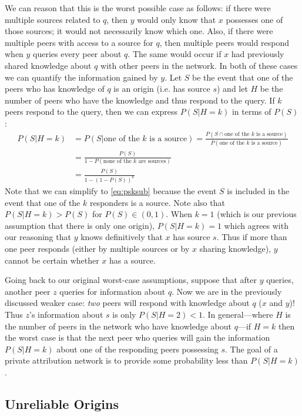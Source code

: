 \documentclass{article}
\begin{document}
We can reason that this is the worst possible case as follows: if there were
multiple sources related to $q$, then $y$ would only know that $x$ possesses one
of those sources; it would not necessarily know which one. Also, if there were
multiple peers with access to a source for $q$, then multiple peers would
respond when $y$ queries every peer about $q$. The same would occur if $x$ had
previously shared knowledge about $q$ with other peers in the network. In both
of these cases we can quantify the information gained by $y$. Let $S$ be the
event that one of the peers who has knowledge of $q$ is an origin (i.e. has
source $s$) and let $H$ be the number of peers who have the knowledge and thus
respond to the query.
If $k$ peers respond to the query, then we can express $P(S|H=k)$ in terms of
$P(S)$:
\begin{align}
	P(S|H=k)&=P(S|\text{one of the $k$ is a source})=\frac{P(S\cap\text{one of
	the $k$ is a source})}{P(\text{one of the $k$ is a source})}\nonumber\\
	&=\frac{P(S)}{1-P(\text{none of the $k$ are sources})}\label{eq:psksub}\\
	&=\frac{P(S)}{1-(1-P(S))^k}\label{eq:psk}
\end{align}
Note that we can simplify to \eqref{eq:psksub} because the event $S$ is included
in the event that one of the $k$ responders is a source. Note also that
$P(S|H=k)>P(S)$ for $P(S)\in(0,1)$. When $k=1$ (which is our previous assumption
that there is only one origin), $P(S|H=k)=1$ which agrees with our reasoning
that $y$ knows definitively that $x$ has source $s$. Thus if more than one peer
responds (either by multiple sources or by $x$ sharing knowledge), $y$ cannot be
certain whether $x$ has a source.

Going back to our original worst-case assumptions, suppose that after $y$
queries, another peer $z$ queries for information about $q$. Now we are in the
previously discussed weaker case: {\it two} peers will respond with knowledge
about $q$ ($x$ and $y$)! Thus $z$'s information about $s$ is only $P(S|H=2)<1$.
In general---where $H$ is the number of peers in the network who have knowledge
about $q$---if $H=k$ then the worst case is that the next peer who queries will
gain the information $P(S|H=k)$ about one of the responding peers possessing
$s$. The goal of a private attribution network is to provide some probability
less than $P(S|H=k)$.

\subsection{Unreliable Origins}
\end{document}

